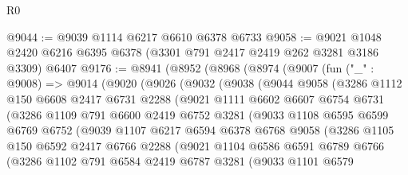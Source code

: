 \begin{lexlean}{R0}
\begin{coremodule}
@9044 := @9039 @1114 @6217 @6610 @6378 @6733
@9058 := @9021 @1048 @2420 @6216 @6395 @6378 (@3301 @791 @2417 @2419 @262 @3281 @3186 @3309) @6407
@9176 := @8941
    (@8952
      (@8968
        (@8974
          (@9007
            (fun ("_" : @9008) =>
            @9014
              (@9020
                (@9026
                  (@9032
                    (@9038
                      (@9044
                        @9058
                        (@3286
                          @1112
                          @150
                          @6608
                          @2417
                          @6731
                          @2288
                          (@9021
                            @1111
                            @6602
                            @6607
                            @6754
                            @6731
                            (@3286
                              @1109
                              @791
                              @6600
                              @2419
                              @6752
                              @3281
                              (@9033
                                @1108
                                @6595
                                @6599
                                @6769
                                @6752
                                (@9039
                                  @1107
                                  @6217
                                  @6594
                                  @6378
                                  @6768
                                  @9058
                                  (@3286
                                    @1105
                                    @150
                                    @6592
                                    @2417
                                    @6766
                                    @2288
                                    (@9021
                                      @1104
                                      @6586
                                      @6591
                                      @6789
                                      @6766
                                      (@3286
                                        @1102
                                        @791
                                        @6584
                                        @2419
                                        @6787
                                        @3281
                                        (@9033
                                          @1101
                                          @6579

\end{coremodule}
\end{lexlean}
